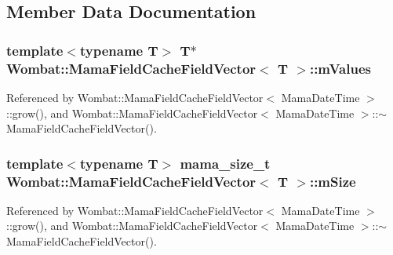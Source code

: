 \subsection{Member Data Documentation}
\hypertarget{classWombat_1_1MamaFieldCacheFieldVector_ae5c35c231520f4788f44a61789073e71}{
\subsubsection[{mValues}]{\setlength{\rightskip}{0pt plus 5cm}template$<$typename T$>$ T$\ast$ {\bf Wombat::MamaFieldCacheFieldVector}$<$ T $>$::{\bf mValues}}}
\label{classWombat_1_1MamaFieldCacheFieldVector_ae5c35c231520f4788f44a61789073e71}


Referenced by Wombat::MamaFieldCacheFieldVector$<$ MamaDateTime $>$::grow(), and Wombat::MamaFieldCacheFieldVector$<$ MamaDateTime $>$::$\sim$MamaFieldCacheFieldVector().\hypertarget{classWombat_1_1MamaFieldCacheFieldVector_a3fb3546a3ea30e06e9bb0a7afa00e06a}{
\subsubsection[{mSize}]{\setlength{\rightskip}{0pt plus 5cm}template$<$typename T$>$ {\bf mama\_\-size\_\-t} {\bf Wombat::MamaFieldCacheFieldVector}$<$ T $>$::{\bf mSize}}}
\label{classWombat_1_1MamaFieldCacheFieldVector_a3fb3546a3ea30e06e9bb0a7afa00e06a}


Referenced by Wombat::MamaFieldCacheFieldVector$<$ MamaDateTime $>$::grow(), and Wombat::MamaFieldCacheFieldVector$<$ MamaDateTime $>$::$\sim$MamaFieldCacheFieldVector().